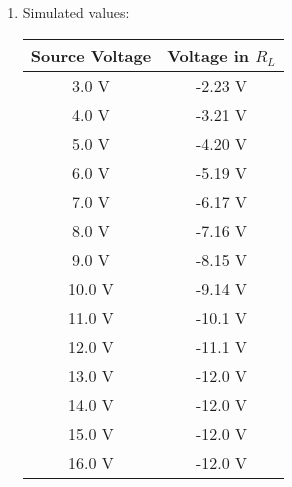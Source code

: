 \begin{tasks}
\begin{multicols}{2}
\begin{enumerate}
\item Simulated values:

\begin{center}
\begin{tabular}[.5cm]{ c c }
\toprule
Source Voltage & Voltage in $R_{L}$ \\
\midrule
3.0 V & -2.23 V \\
\cmidrule{1-2}
4.0 V & -3.21 V \\
\cmidrule{1-2}
5.0 V & -4.20 V \\
\cmidrule{1-2}
6.0 V & -5.19 V \\
\cmidrule{1-2}
7.0 V & -6.17 V \\
\cmidrule{1-2}
8.0 V & -7.16 V \\
\cmidrule{1-2}
9.0 V & -8.15 V \\
\cmidrule{1-2}
10.0 V & -9.14 V \\
\cmidrule{1-2}
11.0 V & -10.1 V \\
\cmidrule{1-2}
12.0 V & -11.1 V \\
\cmidrule{1-2}
13.0 V & -12.0 V \\
\cmidrule{1-2}
14.0 V & -12.0 V \\
\cmidrule{1-2}
15.0 V & -12.0 V \\
\cmidrule{1-2}
16.0 V & -12.0 V \\
\bottomrule
\end{tabular}
\end{center} 
\end{enumerate}
\end{multicols}
\end{tasks}

\pagebreak